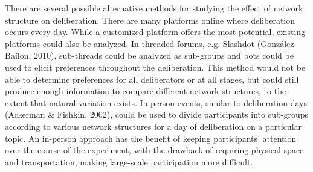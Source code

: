 There are several possible alternative methods for studying the effect of network structure on deliberation. There are many platforms online where deliberation occurs every day. While a customized platform offers the most potential, existing platforms could also be analyzed. In threaded forums, e.g. Slashdot (Gonz\'alez-Ba\'ilon, 2010), sub-threads could be analyzed as sub-groups and bots could be used to elicit preferences throughout the deliberation. This method would not be able to determine preferences for all deliberators or at all stages, but could still produce enough information to compare different network structures, to the extent that natural variation exists. In-person events, similar to deliberation days (Ackerman \& Fishkin, 2002), could be used to divide participants into sub-groups according to various network structures for a day of deliberation on a particular topic. An in-person approach has the benefit of keeping participants’ attention over the course of the experiment, with the drawback of requiring physical space and transportation, making large-scale participation more difficult.
